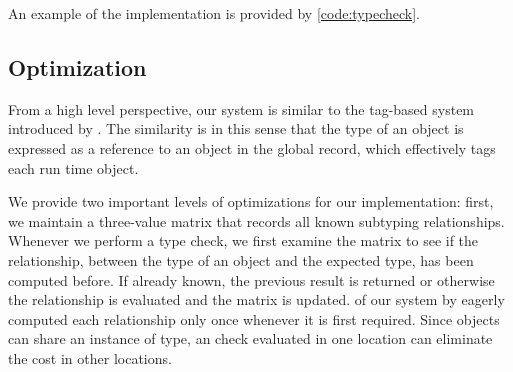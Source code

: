 An example of the implementation is provided by \cref{code:typecheck}.








\subsection{Optimization}
\label{sec:optimization}

From a high level perspective, 
our system is similar to the tag-based system introduced by \citet{Greenman2018}.
The similarity is in this sense that the type of an object is expressed as a reference
to an object in the global record, which
effectively tags each run time object.

We provide two important levels of optimizations for our implementation: 
first, we maintain a three-value matrix that records all known subtyping relationships. 
Whenever we perform a type check, we first examine the matrix to see if the relationship, 
between the type of an object and the expected type, has been computed before.
If already known, the previous result is returned 
or otherwise the relationship is evaluated and the matrix is updated.
 of our system 
by eagerly computed each relationship only once whenever it is first required.
Since objects can share an instance of type,
an check evaluated in one location can eliminate the cost in other locations.

